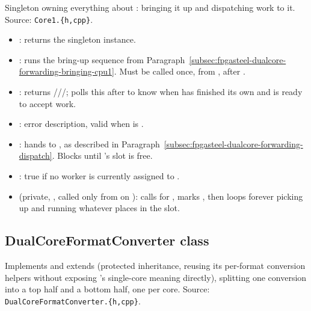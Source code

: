 Singleton owning everything about : bringing it up and dispatching work to it. Source: \lstinline[style=inlineFsRepo]!Core1.{h,cpp}!.

\begin{itemize}
 \item {}: returns the singleton instance.
 \item {}: runs the bring-up sequence from Paragraph~\ref{subsec:fpgasteel-dualcore-forwarding-bringing-cpu1}. Must be called once, from , after .
 \item {}: returns ///;  polls this after  to know when  has finished its own  and is ready to accept work.
 \item {}: error description, valid when  is .
 \item {}: hands  to , as described in Paragraph~\ref{subsec:fpgasteel-dualcore-forwarding-dispatch}. Blocks until 's slot is free.
 \item {}: true if no worker is currently assigned to .
 \item {} (private, , called only from  on ): calls  for , marks  , then loops forever picking up and running whatever  places in the slot.
\end{itemize}

\subsection{DualCoreFormatConverter class}
\label{subsec:fpgasteel-dualcore-forwarding-dualcore-format-converter}

Implements  and extends  (protected inheritance, reusing its per-format conversion helpers without exposing 's single-core meaning directly), splitting one conversion into a top half and a bottom half, one per core. Source: \lstinline[style=inlineFsRepo]!DualCoreFormatConverter.{h,cpp}!.

